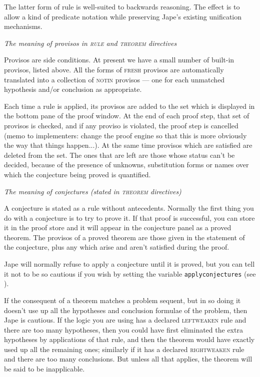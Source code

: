 The latter form of rule is well-suited to backwards reasoning. The effect is to allow a kind of predicate notation while preserving Jape's existing unification mechanisms.


\textit{The meaning of provisos in \textsc{rule} and \textsc{theorem} directives}


Provisos are side conditions. At present we have a small number of built-in provisos, listed above. All the forms of \textsc{fresh} provisos are automatically translated into a collection of \textsc{notin} provisos --- one for each unmatched hypothesis and/or conclusion as appropriate.


Each time a rule is applied, its provisos are added to the set which is displayed in the bottom pane of the proof window. At the end of each proof step, that set of provisos is checked, and if any proviso is violated, the proof step is cancelled (memo to implementers: change the proof engine so that this is more obviously the way that things happen...). At the same time provisos which are satisfied are deleted from the set. The ones that are left are those whose status can't be decided, because of the presence of unknowns, substitution forms or names over which the conjecture being proved is quantified.


\textit{The meaning of conjectures (stated in \textsc{theorem} directives)}


A conjecture is stated as a rule without antecedents. Normally the first thing you do with a conjecture is to try to prove it. If that proof is successful, you can store it in the proof store and it will appear in the conjecture panel as a proved theorem. The provisos of a proved theorem are those given in the statement of the conjecture, plus any which arise and aren't satisfied during the proof.


Jape will normally refuse to apply a conjecture until it is proved, but you can tell it not to be so cautious if you wish by setting the variable \texttt{applyconjectures} (see ).


If the consequent of a theorem matches a problem sequent, but in so doing it doesn't use up all the hypotheses and conclusion formulae of the problem, then Jape is cautious. If the logic you are using has a declared \textsc{leftweaken} rule and there are too many hypotheses, then you could have first eliminated the extra hypotheses by applications of that rule, and then the theorem would have exactly used up all the remaining ones; similarly if it has a declared \textsc{rightweaken} rule and there are too many conclusions. But unless all that applies, the theorem will be said to be inapplicable.


